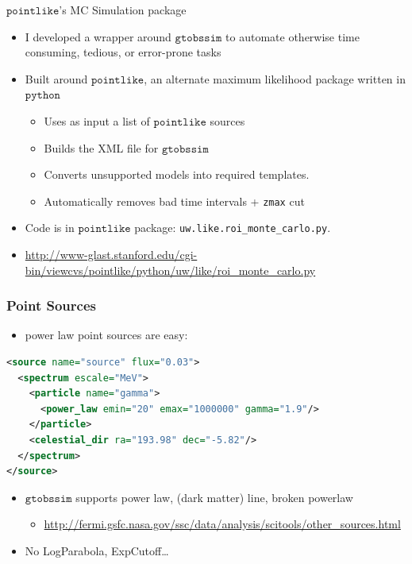 \documentclass[12pt]{beamer}
\newcommand{\python}{\ensuremath{\mathtt{python}}\xspace}
\newcommand{\pointlike}{\ensuremath{\mathtt{pointlike}}\xspace}
\newcommand{\gtobssim}{\ensuremath{\mathtt{gtobssim}}\xspace}
\begin{document}
\begin{frame}{\pointlike's MC Simulation package}
  \begin{itemize}
    \item I developed a wrapper around \gtobssim to automate
      otherwise time consuming, tedious, or error-prone tasks
    \item Built around \pointlike, an alternate maximum
      likelihood package written in \python
      \begin{itemize}
      \item Uses as input a list of \pointlike sources
        \item Builds the XML file for \gtobssim
        \item Converts unsupported models into required templates.
        \item Automatically removes bad time intervals + \texttt{zmax} cut
      \end{itemize}
    \item Code is in \pointlike package: \texttt{uw.like.roi\_monte\_carlo.py}.
    \item \url{http://www-glast.stanford.edu/cgi-bin/viewcvs/pointlike/python/uw/like/roi_monte_carlo.py}
  \end{itemize}
\end{frame}


\begin{frame}[fragile]
  \frametitle{Point Sources}
  \begin{itemize}
    \item power law point sources are easy:
  \end{itemize}

  \begin{lstlisting}[language=XML]
<source name="source" flux="0.03">
  <spectrum escale="MeV">
    <particle name="gamma">
      <power_law emin="20" emax="1000000" gamma="1.9"/>
    </particle>
    <celestial_dir ra="193.98" dec="-5.82"/>
  </spectrum>
</source>
  \end{lstlisting}

  \begin{itemize}
    \item \gtobssim supports power law, (dark matter) line, broken powerlaw
  \begin{itemize}
    \item \url{http://fermi.gsfc.nasa.gov/ssc/data/analysis/scitools/other_sources.html}
  \end{itemize}
\item No LogParabola, ExpCutoff\dots
  \end{itemize}
\end{frame}
\end{document}
